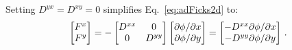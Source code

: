 Setting $D^{yx}=D^{xy}=0$ simplifies Eq.~\eqref{eq:adFicks2d} to:
\begin{equation*}
  \begin{bmatrix}
    F^{x} \\
    F^{y}
  \end{bmatrix}
  = -
  \begin{bmatrix}
    D^{xx} & 0 \\
    0 & D^{yy}
  \end{bmatrix}
  \begin{bmatrix}
    {\partial \phi}/{\partial x} \\
    {\partial \phi}/{\partial y}
  \end{bmatrix}
  = 
  \begin{bmatrix}
    - D^{xx} {\partial \phi}/{\partial x} \\
    - D^{yy} {\partial \phi}/{\partial y}
  \end{bmatrix}
  \,.
\end{equation*}

